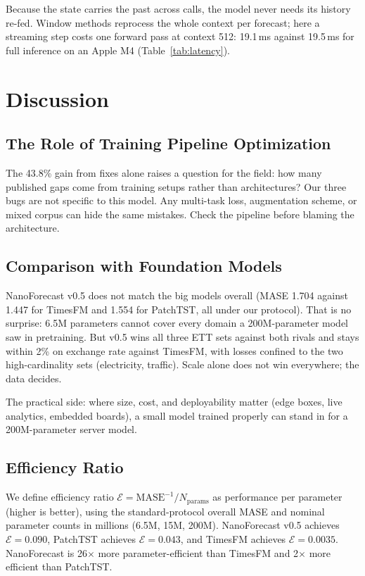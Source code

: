 \documentclass[11pt]{article}
\begin{document}
Because the state carries the past across calls, the model never needs its history re-fed. Window methods reprocess the whole context per forecast; here a streaming step costs one forward pass at context 512: 19.1\,ms against 19.5\,ms for full inference on an Apple M4 (Table~\ref{tab:latency}).

\section{Discussion}
\label{sec:discussion}

\subsection{The Role of Training Pipeline Optimization}
The 43.8\% gain from fixes alone raises a question for the field: how many published gaps come from training setups rather than architectures? Our three bugs are not specific to this model. Any multi-task loss, augmentation scheme, or mixed corpus can hide the same mistakes. Check the pipeline before blaming the architecture.

\subsection{Comparison with Foundation Models}
NanoForecast v0.5 does not match the big models overall (MASE 1.704 against 1.447 for TimesFM and 1.554 for PatchTST, all under our protocol). That is no surprise: 6.5M parameters cannot cover every domain a 200M-parameter model saw in pretraining. But v0.5 wins all three ETT sets against both rivals and stays within 2\% on exchange rate against TimesFM, with losses confined to the two high-cardinality sets (electricity, traffic). Scale alone does not win everywhere; the data decides.

The practical side: where size, cost, and deployability matter (edge boxes, live analytics, embedded boards), a small model trained properly can stand in for a 200M-parameter server model.

\subsection{Efficiency Ratio}
We define efficiency ratio $\mathcal{E} = \text{MASE}^{-1} / N_{\text{params}}$ as performance per parameter (higher is better), using the standard-protocol overall MASE and nominal parameter counts in millions (6.5M, 15M, 200M). NanoForecast v0.5 achieves $\mathcal{E} = 0.090$, PatchTST achieves $\mathcal{E} = 0.043$, and TimesFM achieves $\mathcal{E} = 0.0035$. NanoForecast is 26$\times$ more parameter-efficient than TimesFM and 2$\times$ more efficient than PatchTST.
\end{document}
